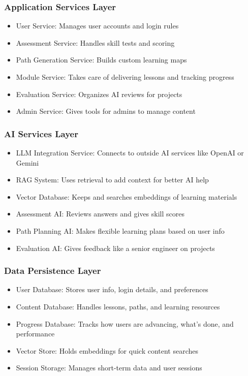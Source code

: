 \documentclass{FastFyp}
\begin{document}
\subsubsection{Application Services Layer}
\begin{itemize}
    \item User Service: Manages user accounts and login rules
    \item Assessment Service: Handles skill tests and scoring
    \item Path Generation Service: Builds custom learning maps
    \item Module Service: Takes care of delivering lessons and tracking progress
    \item Evaluation Service: Organizes AI reviews for projects
    \item Admin Service: Gives tools for admins to manage content
\end{itemize}
\subsubsection{AI Services Layer}
\begin{itemize}
    \item LLM Integration Service: Connects to outside AI services like OpenAI or Gemini
    \item RAG System: Uses retrieval to add context for better AI help
    \item Vector Database: Keeps and searches embeddings of learning materials
    \item Assessment AI: Reviews answers and gives skill scores
    \item Path Planning AI: Makes flexible learning plans based on user info
    \item Evaluation AI: Gives feedback like a senior engineer on projects
\end{itemize}
\subsubsection{Data Persistence Layer}
\begin{itemize}
    \item User Database: Stores user info, login details, and preferences
    \item Content Database: Handles lessons, paths, and learning resources
    \item Progress Database: Tracks how users are advancing, what's done, and performance
    \item Vector Store: Holds embeddings for quick content searches
    \item Session Storage: Manages short-term data and user sessions
\end{itemize}
\end{document}
